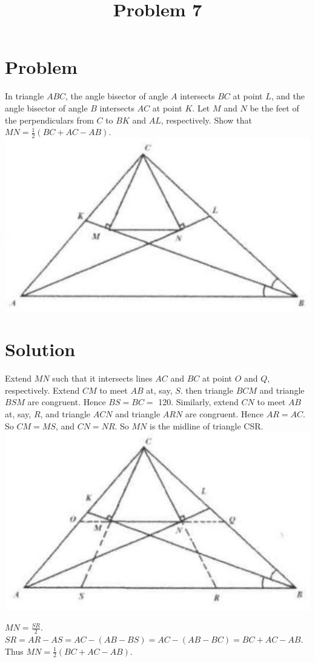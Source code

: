 \documentclass{article}
\title{Problem 7}
\date{}
\begin{document}
\maketitle

\section*{Problem}
In triangle \(A B C\), the angle bisector of angle \(A\) intersects \(B C\) at point \(L\), and the angle bisector of angle \(B\) intersects \(A C\) at point \(K\). Let \(M\) and \(N\) be the feet of the perpendiculars from \(C\) to \(B K\) and \(A L\), respectively. Show that \(M N=\frac{1}{2}(B C+A C-A B)\).\\
\centering
\includegraphics[width=\textwidth]{images/problem_image_1.jpg}

\section*{Solution}
Extend \(M N\) such that it intersects lines \(A C\) and \(B C\) at point \(O\) and \(Q\), respectively. Extend \(C M\) to meet \(A B\) at, say, \(S\). then triangle \(B C M\) and triangle \(B S M\) are congruent. Hence \(B S=B C=\) 120. Similarly, extend \(C N\) to meet \(A B\) at, say, \(R\), and triangle \(A C N\) and triangle \(A R N\) are congruent. Hence \(A R=A C\). So \(C M=M S\), and \(C N=N R\). So \(M N\) is the midline of triangle CSR.\\
\centering
\includegraphics[width=\textwidth]{images/reasoning_image_1.jpg}


\(M N=\frac{S R}{2}\).\\
\(S R=A R-A S=A C-(A B-B S)=A C-(A B-B C)=B C+A C-A B\).\\
Thus \(M N=\frac{1}{2}(B C+A C-A B)\).
\end{document}
